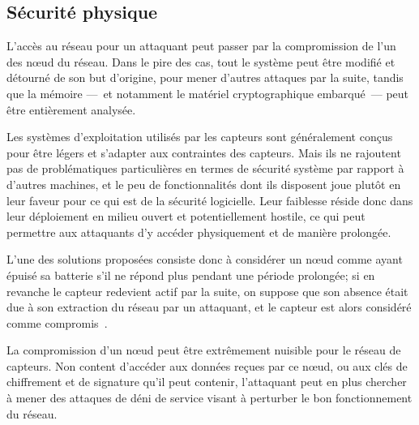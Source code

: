 \subsection{Sécurité physique}

L'accès au réseau pour un attaquant peut passer par la compromission de l'un des nœud du réseau.
Dans le pire des cas, tout le système peut être modifié et détourné de son but d'origine, pour mener d'autres attaques par la suite, tandis que la mémoire ---~et notamment le matériel cryptographique embarqué~--- peut être entièrement analysée.

Les systèmes d'exploitation utilisés par les capteurs sont généralement conçus pour être légers et s'adapter aux contraintes des capteurs.
Mais ils ne rajoutent pas de problématiques particulières en termes de sécurité système par rapport à d'autres machines, et le peu de fonctionnalités dont ils disposent joue plutôt en leur faveur pour ce qui est de la sécurité logicielle.
Leur faiblesse réside donc dans leur déploiement en milieu ouvert et potentiellement hostile, ce qui peut permettre aux attaquants d'y accéder physiquement et de manière prolongée.

L'une des solutions proposées consiste donc à considérer un nœud comme ayant épuisé sa batterie s'il ne répond plus pendant une période prolongée; si en revanche le capteur redevient actif par la suite, on suppose que son absence était due à son extraction du réseau par un attaquant, et le capteur est alors considéré comme compromis~\cite{Ho10}.

La compromission d'un nœud peut être extrêmement nuisible pour le réseau de capteurs.
Non content d'accéder aux données reçues par ce nœud, ou aux clés de chiffrement et de signature qu'il peut contenir, l'attaquant peut en plus chercher à mener des attaques de déni de service visant à perturber le bon fonctionnement du réseau.
